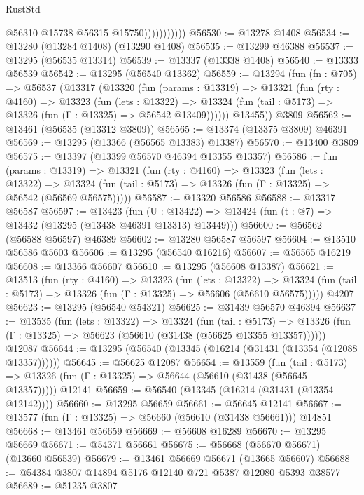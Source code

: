 \begin{lexlean}{RustStd}
\begin{coremodule}
                          @56310
                          @15738
                          @56315
                          @15750)))))))))))
@56530 := @13278 @1408
@56534 := @13280 (@13284 @1408) (@13290 @1408)
@56535 := @13299 @46388
@56537 := @13295 (@56535 @13314)
@56539 := @13337 (@13338 @1408)
@56540 := @13333 @56539
@56542 := @13295 (@56540 @13362)
@56559 := @13294
    (fun (fn : @705) =>
    @56537
      (@13317
        (@13320
          (fun (params : @13319) =>
          @13321
            (fun (rty : @4160) =>
            @13323
              (fun (lets : @13322) =>
              @13324 (fun (tail : @5173) => @13326 (fun (Γ : @13325) => @56542 @13409))))))
        @13455))
    @3809
@56562 := @13461 (@56535 (@13312 @3809))
@56565 := @13374 (@13375 @3809) @46391
@56569 := @13295 (@13366 (@56565 @13383) @13387)
@56570 := @13400 @3809
@56575 := @13397 (@13399 @56570 @46394 @13355 @13357)
@56586 := fun (params : @13319) =>
  @13321
    (fun (rty : @4160) =>
    @13323
      (fun (lets : @13322) =>
      @13324 (fun (tail : @5173) => @13326 (fun (Γ : @13325) => @56542 (@56569 @56575)))))
@56587 := @13320 @56586
@56588 := @13317 @56587
@56597 := @13423
    (fun (U : @13422) => @13424 (fun (t : @7) => @13432 (@13295 (@13438 @46391 @13313) @13449)))
@56600 := @56562 (@56588 @56597) @46389
@56602 := @13280 @56587 @56597
@56604 := @13510 @56586 @5603
@56606 := @13295 (@56540 @16216)
@56607 := @56565 @16219
@56608 := @13366 @56607
@56610 := @13295 (@56608 @13387)
@56621 := @13513
    (fun (rty : @4160) =>
    @13323
      (fun (lets : @13322) =>
      @13324 (fun (tail : @5173) => @13326 (fun (Γ : @13325) => @56606 (@56610 @56575)))))
    @4207
@56623 := @13295 (@56540 @54321)
@56625 := @31439 @56570 @46394
@56637 := @13535
    (fun (lets : @13322) =>
    @13324
      (fun (tail : @5173) =>
      @13326 (fun (Γ : @13325) => @56623 (@56610 (@31438 (@56625 @13355 @13357))))))
    @12087
@56644 := @13295 (@56540 (@13345 (@16214 (@31431 (@13354 (@12088 @13357))))))
@56645 := @56625 @12087
@56654 := @13559
    (fun (tail : @5173) => @13326 (fun (Γ : @13325) => @56644 (@56610 (@31438 (@56645 @13357)))))
    @12141
@56659 := @56540 (@13345 (@16214 (@31431 (@13354 @12142))))
@56660 := @13295 @56659
@56661 := @56645 @12141
@56667 := @13577 (fun (Γ : @13325) => @56660 (@56610 (@31438 @56661))) @14851
@56668 := @13461 @56659
@56669 := @56608 @16289
@56670 := @13295 @56669
@56671 := @54371 @56661
@56675 := @56668 (@56670 @56671) (@13660 @56539)
@56679 := @13461 @56669 @56671 (@13665 @56607)
@56688 := @54384 @3807 @14894 @5176 @12140 @721 @5387 @12080 @5393 @38577
@56689 := @51235 @3807

\end{coremodule}
\end{lexlean}
